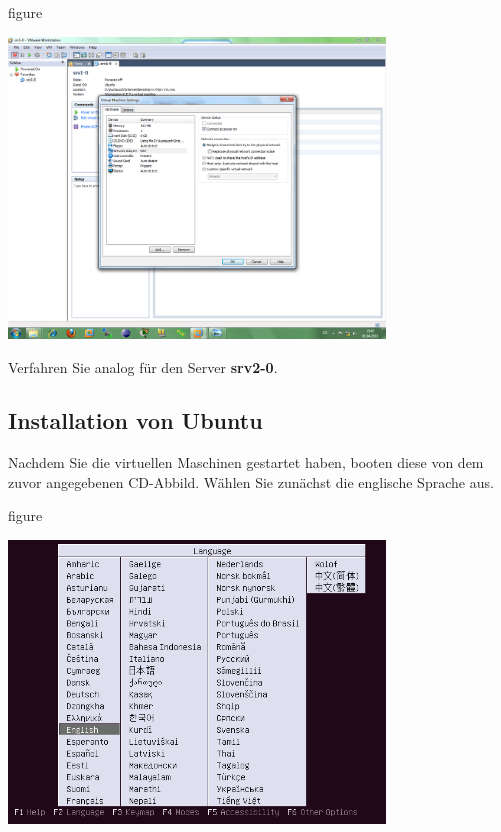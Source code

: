\begin{nofloat}{figure}
\begin{center}
\includegraphics[width=0.75\textwidth]{screenshots/vm10.png}
\end{center}
\end{nofloat}

Verfahren Sie analog für den Server \textbf{srv2-0}.

\subsection{Installation von Ubuntu}

Nachdem Sie die virtuellen Maschinen gestartet haben, booten diese von dem zuvor angegebenen CD-Abbild. Wählen Sie zunächst die
englische Sprache aus. 
\begin{nofloat}{figure}
\begin{center}
\includegraphics[width=0.75\textwidth]{screenshots/01_ubuntu_install.png}
\end{center}
\end{nofloat}

